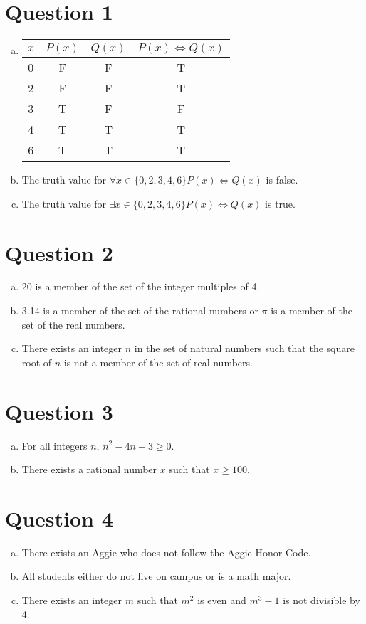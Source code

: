 \documentclass{article}
\begin{document}
\section*{Question 1}
\begin{enumerate}[(a)]
    \item
        \begin{tabular}{c|c|c|c}
            $x$ & $P(x)$ & $Q(x)$ & $P(x) \iff Q(x)$ \\
            \hline
            0 & F & F & T \\
            2 & F & F & T \\
            3 & T & F & F \\
            4 & T & T & T \\
            6 & T & T & T \\
        \end{tabular}
    \item The truth value for $\forall x \in \{0, 2, 3, 4, 6\} P(x) \iff Q(x)$ is false.
    \item The truth value for $\exists x \in \{0, 2, 3, 4, 6\} P(x) \iff Q(x)$ is true.
\end{enumerate}


\section*{Question 2}
\begin{enumerate}[(a)]
    \item 20 is a member of the set of the integer multiples of 4.
    \item 3.14 is a member of the set of the rational numbers or $\pi$ is a member of the set of the real numbers.
    \item There exists an integer $n$ in the set of natural numbers such that the square root of $n$ is not a member of the set of real numbers.
\end{enumerate}

\section*{Question 3}
\begin{enumerate}[(a)]
    \item For all integers $n$, $n^2 -4n +3 \geq 0$.
    \item There exists a rational number $x$ such that $x \geq 100$.
\end{enumerate}

\section*{Question 4}
\begin{enumerate}[(a)]
    \item There exists an Aggie who does not follow the Aggie Honor Code.
    \item All students either do not live on campus or is a math major.
    \item There exists an integer $m$ such that $m^2$ is even and $m^3 - 1$ is not divisible by 4.
\end{enumerate}
\end{document}
